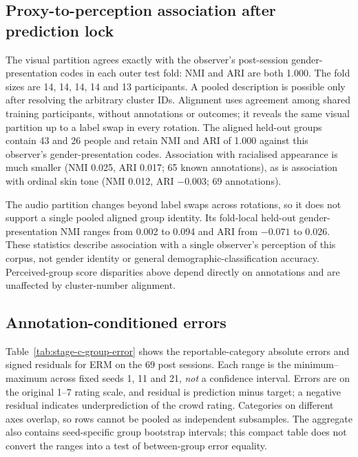 \subsection{Proxy-to-perception association after prediction lock}

The visual partition agrees exactly with the observer's post-session gender-presentation
codes in each outer test fold: NMI and ARI are both 1.000. The fold sizes are 14, 14, 14,
14 and 13 participants. A pooled description is possible only after resolving the
arbitrary cluster IDs. Alignment uses agreement among shared training participants,
without annotations or outcomes; it reveals the same visual partition up to a label
swap in every rotation. The aligned held-out groups contain 43 and 26 people and
retain NMI and ARI of 1.000 against this observer's gender-presentation codes.
Association with racialised appearance is much smaller (NMI 0.025, ARI 0.017;
65 known annotations), as is association with ordinal skin tone (NMI 0.012,
ARI $-0.003$; 69 annotations).

The audio partition changes beyond label swaps across rotations, so it does not support
a single pooled aligned group identity. Its fold-local held-out gender-presentation
NMI ranges from 0.002 to 0.094 and ARI from $-0.071$ to 0.026. These statistics describe
association with a single observer's perception of this corpus, not gender identity
or general demographic-classification accuracy. Perceived-group score disparities
above depend directly on annotations and are unaffected by cluster-number alignment.

\subsection{Annotation-conditioned errors}

Table~\ref{tab:stage-c-group-error} shows the reportable-category absolute errors and signed
residuals for ERM on the 69 post sessions. Each range is the minimum--maximum across fixed seeds
1, 11 and 21, \emph{not} a confidence interval. Errors are on the original 1--7 rating scale,
and residual is prediction minus target; a negative residual indicates underprediction of the
crowd rating. Categories on different axes overlap, so rows cannot be pooled as independent
subsamples. The aggregate also contains seed-specific group bootstrap intervals; this compact
table does not convert the ranges into a test of between-group error equality.

